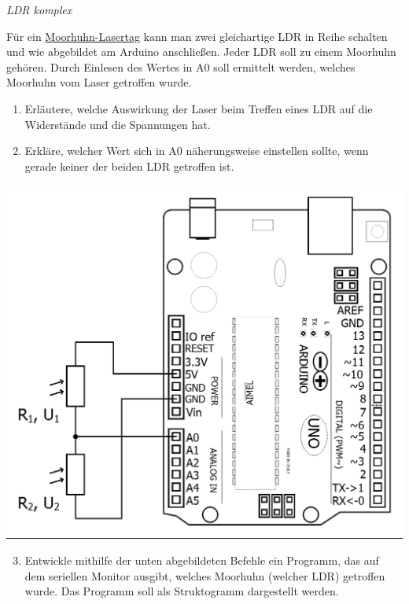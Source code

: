 \documentclass[ngerman, 11pt]{scrreprt}
\begin{document}
	\newpage
	\begin{aufgabe} \emph{LDR komplex}
		
		\medskip
		\begin{minipage}{0.5\textwidth}
			Für ein \href{https://www.el-voss.de/?p=159}{Moorhuhn-Lasertag} kann man zwei gleichartige LDR in Reihe schalten und wie abgebildet am Arduino anschließen. Jeder LDR soll zu einem Moorhuhn gehören. Durch Einlesen des Wertes in A0 soll ermittelt werden, welches Moorhuhn vom Laser getroffen wurde.
			
			\begin{enumerate}[label=\alph*), itemsep=0mm, parsep=0mm]
				\item Erläutere, welche Auswirkung der Laser beim Treffen eines LDR auf die Widerstände und die Spannungen hat.
				\item Erkläre, welcher Wert sich in A0 näherungsweise einstellen sollte, wenn gerade keiner der beiden LDR getroffen ist.
			\end{enumerate}
		\end{minipage}
		\hfill
		\begin{minipage}{0.48\textwidth}
			\centering
			\includegraphics[width=\textwidth]{../Zeichnungen/schaltplan-ldr-in-reihe.png}
		\end{minipage}
		
		\begin{enumerate}[label=\alph*), itemsep=0mm, parsep=0mm]
			\setcounter{enumi}{2}
			\item Entwickle mithilfe der unten abgebildeten Befehle ein Programm, das auf dem seriellen Monitor ausgibt, welches Moorhuhn (welcher LDR) getroffen wurde. Das Programm soll als Struktogramm dargestellt werden.
		\end{enumerate}
		

\end{aufgabe}
\end{document}
